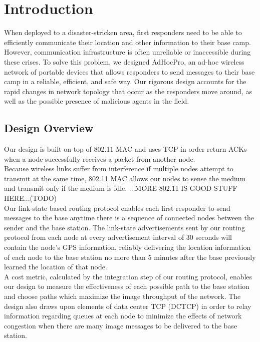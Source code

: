 \documentclass[letterpaper]{article}
\begin{document}
\section{Introduction}

When deployed to a disaster-stricken area, first responders need to be able to efficiently communicate their
location and other information to their base camp. However, communication infrastructure is often unreliable
or inaccessible during these crises. To solve this problem, we designed AdHocPro, an ad-hoc wireless network of
portable devices that allows responders to send messages to their base camp in a reliable, efficient, and safe
way. Our rigorous design accounts for the rapid changes in network topology that occur as the responders move 
around, as well as the possible presence of malicious agents in the field. 

\subsection{Design Overview}

Our design is built on top of 802.11 MAC and uses TCP in order return ACKs when a node successfully receives
a packet from another node.
\\

\noindent Because wireless links suffer from interference if multiple nodes attempt to transmit at the same time,
802.11 MAC allows our nodes to sense the medium and transmit only if the medium is idle. ...MORE 802.11
IS GOOD STUFF HERE...(TODO)
\\

\noindent Our link-state based routing protocol enables each first responder to send messages to the base anytime
there is a sequence of connected nodes between the sender and the base station. The link-state advertisements 
sent by our routing protocol from each node at every advertisement interval of 30 seconds will contain the node's
GPS  information, reliably delivering the location information of each node to the base station no more than
5 minutes after the base previously learned the location of that node.
\\

\noindent A cost metric, calculated by the integration step of our routing protocol, enables our design to measure
the effectiveness of each possible path to the base station and choose paths which maximize the image 
throughput of the network. The design also draws upon elements of data center TCP (DCTCP) in order to relay 
information regarding queues at each node to minimize the effects of network congestion when there are many
image messages to be delivered to the base station. 
\\
\end{document}
